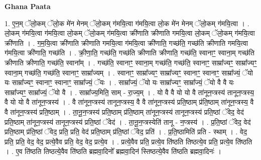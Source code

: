 \documentclass[17pt]{extarticle}
\begin{document}
\textbf{Ghana Paata } \newline

1. ए॒न॒म् ॅलो॒कम् ॅलो॒क मे॑न मेनम् ॅलो॒कम् ग॑मयि॒त्वा ग॑मयि॒त्वा लो॒क मे॑न मेनम् ॅलो॒कम् ग॑मयि॒त्वा । . लो॒कम् ग॑मयि॒त्वा ग॑मयि॒त्वा लो॒कम् ॅलो॒कम् ग॑मयि॒त्वा क्री॑णाति क्रीणाति गमयि॒त्वा लो॒कम् ॅलो॒कम् ग॑मयि॒त्वा क्री॑णाति । . ग॒म॒यि॒त्वा क्री॑णाति क्रीणाति गमयि॒त्वा ग॑मयि॒त्वा क्री॑णाति॒ गच्छ॑ति॒ गच्छ॑ति क्रीणाति गमयि॒त्वा ग॑मयि॒त्वा क्री॑णाति॒ गच्छ॑ति । . क्री॒णा॒ति॒ गच्छ॑ति॒ गच्छ॑ति क्रीणाति क्रीणाति॒ गच्छ॑ति॒ स्वानाꣳ॒॒ स्वाना॒म् गच्छ॑ति क्रीणाति क्रीणाति॒ गच्छ॑ति॒ स्वाना᳚म् । . गच्छ॑ति॒ स्वानाꣳ॒॒ स्वाना॒म् गच्छ॑ति॒ गच्छ॑ति॒ स्वानाꣳ॒॒ साम्रा᳚ज्यꣳ॒॒ साम्रा᳚ज्यꣳ॒॒ स्वाना॒म् गच्छ॑ति॒ गच्छ॑ति॒ स्वानाꣳ॒॒ साम्रा᳚ज्यम् । . स्वानाꣳ॒॒ साम्रा᳚ज्यꣳ॒॒ साम्रा᳚ज्यꣳ॒॒ स्वानाꣳ॒॒ स्वानाꣳ॒॒ साम्रा᳚ज्यं॒ ॅयो यः साम्रा᳚ज्यꣳ॒॒ स्वानाꣳ॒॒ स्वानाꣳ॒॒ साम्रा᳚ज्यं॒ ॅयः । . साम्रा᳚ज्यं॒ ॅयो यः साम्रा᳚ज्यꣳ॒॒ साम्रा᳚ज्यं॒ ॅयो वै वै यः साम्रा᳚ज्यꣳ॒॒ साम्रा᳚ज्यं॒ ॅयो वै । . साम्रा᳚ज्य॒मिति॒ साम् - रा॒ज्य॒म् । . यो वै वै यो यो वै ता॑नून॒प्त्रस्य॑ तानून॒प्त्रस्य॒ वै यो यो वै ता॑नून॒प्त्रस्य॑ । . वै ता॑नून॒प्त्रस्य॑ तानून॒प्त्रस्य॒ वै वै ता॑नून॒प्त्रस्य॑ प्रति॒ष्ठाम् प्र॑ति॒ष्ठाम् ता॑नून॒प्त्रस्य॒ वै वै ता॑नून॒प्त्रस्य॑ प्रति॒ष्ठाम् । . ता॒नू॒न॒प्त्रस्य॑ प्रति॒ष्ठाम् प्र॑ति॒ष्ठाम् ता॑नून॒प्त्रस्य॑ तानून॒प्त्रस्य॑ प्रति॒ष्ठां ॅवेद॒ वेद॑ प्रति॒ष्ठाम् ता॑नून॒प्त्रस्य॑ तानून॒प्त्रस्य॑ प्रति॒ष्ठां ॅवेद॑ । . ता॒नू॒न॒प्त्रस्येति॑ तानू - न॒प्त्रस्य॑ । . प्र॒ति॒ष्ठां ॅवेद॒ वेद॑ प्रति॒ष्ठाम् प्र॑ति॒ष्ठां ॅवेद॒ प्रति॒ प्रति॒ वेद॑ प्रति॒ष्ठाम् प्र॑ति॒ष्ठां ॅवेद॒ प्रति॑ । . प्र॒ति॒ष्ठामिति॑ प्रति - स्थाम् । . वेद॒ प्रति॒ प्रति॒ वेद॒ वेद॒ प्रत्ये॒वैव प्रति॒ वेद॒ वेद॒ प्रत्ये॒व । . प्रत्ये॒वैव प्रति॒ प्रत्ये॒व ति॑ष्ठति तिष्ठत्ये॒व प्रति॒ प्रत्ये॒व ति॑ष्ठति । . ए॒व ति॑ष्ठति तिष्ठत्ये॒वैव ति॑ष्ठति ब्रह्मवा॒दिनो᳚ ब्रह्मवा॒दिन॑ स्तिष्ठत्ये॒वैव ति॑ष्ठति ब्रह्मवा॒दिनः॑ । \newline
\end{document}
